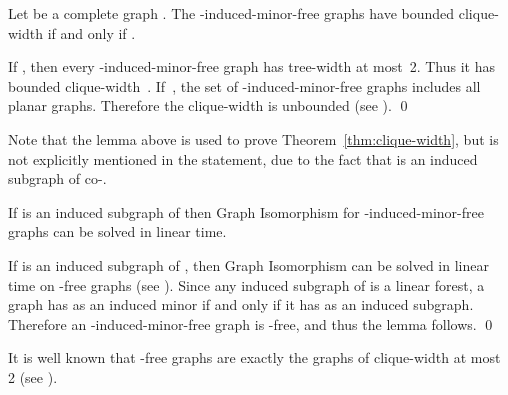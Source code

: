 \documentclass[envcountsame,envcountsect,11pt,a4paper]{llncs}
\renewenvironment{proof}{\begin{Proof}}{\qed\end{Proof}}
\begin{document}
\begin{lemma}
Let  be a complete graph .
The -induced-minor-free graphs have bounded clique-width if and only if .
\end{lemma}
\begin{proof}
If , then every -induced-minor-free graph has tree-width at most~2.
Thus it has bounded clique-width~\cite{CR05,CourcelleOlariu2000}.
If~, the set of -induced-minor-free graphs includes all planar graphs.
Therefore the clique-width is unbounded (see \cite{KaminskiLozinMilanic2009}).
\end{proof}

Note that the lemma above is used to prove Theorem~\ref{thm:clique-width},
but  is not explicitly mentioned in the statement, due to the fact that  is an induced subgraph of co-.

\begin{lemma}
\label{lem:P4-GI}
If  is an induced subgraph of 
then {\sc Graph Isomorphism} for -induced-minor-free graphs can be solved in linear time.
\end{lemma}
\begin{proof}
If  is an induced subgraph of ,
then {\sc Graph Isomorphism} can be solved in linear time on -free graphs (see {\cite[\S 2.7]{BoothColbourn1979}}).
Since any induced subgraph of  is a linear forest,
a graph has  as an induced minor if and only if
it has  as an induced subgraph.
Therefore an -induced-minor-free graph is -free, and thus the lemma follows.
\end{proof}

It is well known that -free graphs
are exactly the graphs of clique-width at most 2 (see \cite{KaminskiLozinMilanic2009}).
\end{document}
